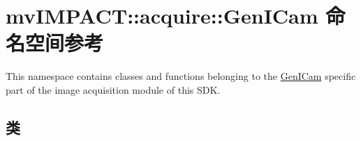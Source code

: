 \hypertarget{namespacemv_i_m_p_a_c_t_1_1acquire_1_1_gen_i_cam}{\section{mv\+I\+M\+P\+A\+C\+T\+:\+:acquire\+:\+:Gen\+I\+Cam 命名空间参考}
\label{namespacemv_i_m_p_a_c_t_1_1acquire_1_1_gen_i_cam}
}


This namespace contains classes and functions belonging to the \hyperlink{namespacemv_i_m_p_a_c_t_1_1acquire_1_1_gen_i_cam}{Gen\+I\+Cam} specific part of the image acquisition module of this S\+D\+K.  


\subsection*{类}
